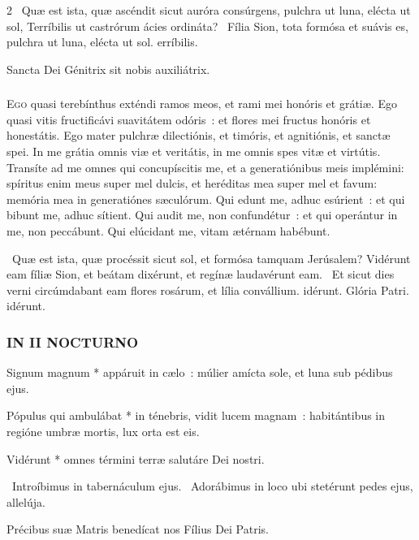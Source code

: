 \documentclass[9pt,twoside]{extarticle}
\begin{document}
\begin{multicols}{2}
~Quæ est ista, quæ ascéndit sicut auróra consúrgens, pulchra ut luna, elécta ut sol, \textred{*} Terríbilis ut castrórum ácies ordináta?
~Fília Sion, tota formósa et suávis es, pulchra ut luna, elécta ut sol. erríbilis.

\medskip
{\small {} Sancta Dei Génitrix sit nobis auxiliátrix.}
\subsubsection*{\center {}}
\lettrine{E}{go} quasi terebínthus exténdi ramos meos, et rami mei honóris et grátiæ.
Ego quasi vitis fructificávi suavitátem odóris~: et flores mei fructus honóris et honestátis.
Ego mater pulchræ dilectiónis, et timóris, et agnitiónis, et sanctæ spei.
In me grátia omnis viæ et veritátis, in me omnis spes vitæ et virtútis.
Transíte ad me omnes qui concupíscitis me, et a generatiónibus meis implémini:
spíritus enim meus super mel dulcis, et heréditas mea super mel et favum:
memória mea in generatiónes sæculórum.
Qui edunt me, adhuc esúrient~: et qui bibunt me, adhuc sítient.
Qui audit me, non confundétur~: et qui operántur in me, non peccábunt.
Qui elúcidant me, vitam ætérnam habébunt.

~Quæ est ista, quæ procéssit sicut sol, et formósa tamquam Jerúsalem? \textred{*} Vidérunt eam fíliæ Sion, et beátam dixérunt, et regínæ laudavérunt eam. ~Et sicut dies verni circúmdabant eam flores rosárum, et lília convállium. idérunt. Glória Patri. idérunt.

\subsubsection*{\center \normalfont \textsc{IN II NOCTURNO}}

\smallskip
{} Signum magnum * appáruit in cælo~: múlier amícta sole, et luna sub pédibus ejus.

 Pópulus qui ambulábat * in ténebris, vidit lucem magnam~: habitántibus in regióne umbræ mortis, lux orta est eis.

 Vidérunt * omnes términi terræ salutáre Dei nostri.

\smallskip
{}~Introíbimus in tabernáculum ejus. ~Adorábimus in loco ubi stetérunt pedes ejus, allelúja.

\medskip
\small {} Précibus suæ Matris benedícat nos Fílius Dei Patris.


\end{multicols}
\end{document}
